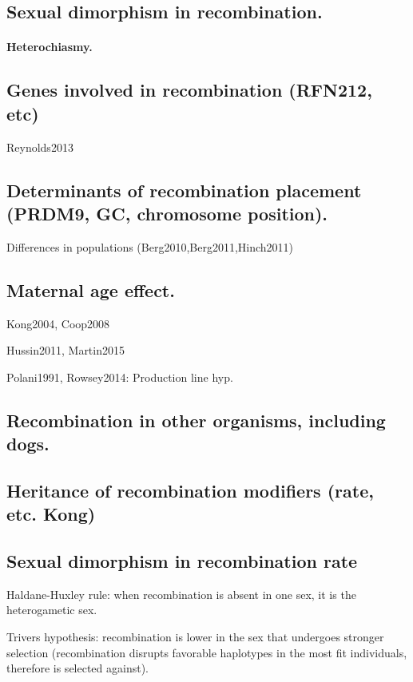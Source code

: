 \subsection{Sexual dimorphism in recombination.}
\paragraph{Heterochiasmy.}


\subsection{Genes involved in recombination (RFN212, etc)}
Reynolds2013

\subsection{Determinants of recombination placement (PRDM9, GC, chromosome position).}

Differences in populations (Berg2010,Berg2011,Hinch2011)

\subsection{Maternal age effect.}

Kong2004, Coop2008

Hussin2011, Martin2015

Polani1991, Rowsey2014: Production line hyp.

\subsection{Recombination in other organisms, including dogs.}
\subsection{Heritance of recombination modifiers (rate, etc. Kong)}
\subsection{Sexual dimorphism in recombination rate}

Haldane-Huxley rule: when recombination is absent in one sex, it is the heterogametic sex.

Trivers hypothesis: recombination is lower in the sex that undergoes stronger selection (recombination disrupts favorable haplotypes in the most fit individuals, therefore is selected against).


